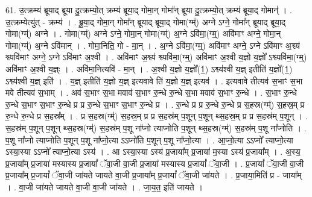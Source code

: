 \documentclass[17pt]{extarticle}
\begin{document}
61. उ॒त्क्रम्य॑ ब्रूयाद् ब्रूया दु॒त्क्रम्यो॒त् क्रम्य॑ ब्रूया॒द् गोमा॒न् गोमा᳚न् ब्रूया दु॒त्क्रम्यो॒त् क्रम्य॑ ब्रूया॒द् गोमान्॑ । . उ॒त्क्रम्येत्यु॑त् - क्रम्य॑ । . ब्रू॒या॒द् गोमा॒न् गोमा᳚न् ब्रूयाद् ब्रूया॒द् गोमा(ग्म्॑) अग्ने ऽग्ने॒ गोमा᳚न् ब्रूयाद् ब्रूया॒द् गोमा(ग्म्॑) अग्ने । . गोमा(ग्म्॑) अग्ने ऽग्ने॒ गोमा॒न् गोमा(ग्म्॑) अ॒ग्ने ऽवि॑मा॒(ग्म्॒) अवि॑माꣳ अग्ने॒ गोमा॒न् गोमा(ग्म्॑) अ॒ग्ने ऽवि॑मान् । . गोमा॒निति॒ गो - मा॒न् । . अ॒ग्ने ऽवि॑मा॒(ग्म्॒) अवि॑माꣳ अग्ने॒ ऽग्ने ऽवि॑माꣳ अ॒श्व्य॑ श्व्यवि॑माꣳ अग्ने॒ ऽग्ने ऽवि॑माꣳ अ॒श्वी । . अवि॑माꣳ अ॒श्व्य॑ श्व्यवि॑मा॒(ग्म्॒) अवि॑माꣳ अ॒श्वी य॒ज्ञो य॒ज्ञो᳚ ऽश्व्यवि॑मा॒(ग्म्॒) अवि॑माꣳ अ॒श्वी य॒ज्ञ्ः । . अवि॑मा॒नित्यवि॑ - मा॒न् । . अ॒श्वी य॒ज्ञो य॒ज्ञो᳚(1॒) ऽश्व्य॑श्वी य॒ज्ञ् इतीति॑ य॒ज्ञो᳚(1॒) ऽश्व्य॑श्वी य॒ज्ञ् इति॑ । . य॒ज्ञ् इतीति॑ य॒ज्ञो य॒ज्ञ् इत्यवावे ति॑ य॒ज्ञो य॒ज्ञ् इत्यव॑ । . इत्यवावे तीत्यव॑ स॒भाꣳ स॒भा मवे तीत्यव॑ स॒भाम् । . अव॑ स॒भाꣳ स॒भा मवाव॑ स॒भाꣳ रु॒न्धे रु॒न्धे स॒भा मवाव॑ स॒भाꣳ रु॒न्धे । . स॒भाꣳ रु॒न्धे रु॒न्धे स॒भाꣳ स॒भाꣳ रु॒न्धे प्र प्र रु॒न्धे स॒भाꣳ स॒भाꣳ रु॒न्धे प्र । . रु॒न्धे प्र प्र रु॒न्धे रु॒न्धे प्र स॒हस्र(ग्म्॑) स॒हस्र॒म् प्र रु॒न्धे रु॒न्धे प्र स॒हस्र᳚म् । . प्र स॒हस्र(ग्म्॑) स॒हस्र॒म् प्र प्र स॒हस्र॑म् प॒शून् प॒शून् थ्स॒हस्र॒म् प्र प्र स॒हस्र॑म् प॒शून् । . स॒हस्र॑म् प॒शून् प॒शून् थ्स॒हस्र(ग्म्॑) स॒हस्र॑म् प॒शू ना᳚प्नो त्याप्नोति प॒शून् थ्स॒हस्र(ग्म्॑) स॒हस्र॑म् प॒शू ना᳚प्नोति । . प॒शू ना᳚प्नो त्याप्नोति प॒शून् प॒शू ना᳚प्नो॒त्या ऽऽप्नो॑ति प॒शून् प॒शू ना᳚प्नो॒त्या । . आ॒प्नो॒त्या ऽऽप्नो᳚ त्याप्नो॒त्या ऽस्या॒स्या ऽऽप्नो᳚ त्याप्नो॒त्या ऽस्य॑ । . आ ऽस्या॒स्या ऽस्य॑ प्र॒जाया᳚म् प्र॒जाया॑ म॒स्या ऽस्य॑ प्र॒जाया᳚म् । . अ॒स्य॒ प्र॒जाया᳚म् प्र॒जाया॑ मस्यास्य प्र॒जायां᳚ ॅवा॒जी वा॒जी प्र॒जाया॑ मस्यास्य प्र॒जायां᳚ ॅवा॒जी । . प्र॒जायां᳚ ॅवा॒जी वा॒जी प्र॒जाया᳚म् प्र॒जायां᳚ ॅवा॒जी जा॑यते जायते वा॒जी प्र॒जाया᳚म् प्र॒जायां᳚ ॅवा॒जी जा॑यते । . प्र॒जाया॒मिति॑ प्र - जाया᳚म् । . वा॒जी जा॑यते जायते वा॒जी वा॒जी जा॑यते । . जा॒य॒त॒ इति॑ जायते । \newline
\pagebreak
{}
\end{document}
